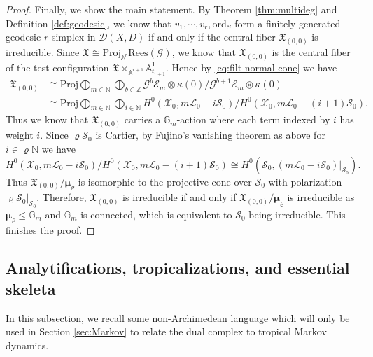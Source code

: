 \documentclass[reqno, 12pt]{amsart}
\theoremstyle{definition}
\newcommand{\bA}{\mathbb{A}}
\newcommand{\bZ}{\mathbb{Z}}
\newcommand{\bN}{\mathbb{N}}
\newcommand{\bG}{\mathbb{G}}
\newcommand{\cX}{\mathcal{X}}
\newcommand{\cL}{\mathcal{L}}
\newcommand{\cG}{\mathcal{G}}
\newcommand{\cE}{\mathcal{E}}
\newcommand{\cD}{\mathcal{D}}
\newcommand{\cS}{\mathcal{S}}
\newcommand{\ord}{\mathrm{ord}}
\newcommand{\Proj}{\mathrm{Proj}}
\newcommand{\fX}{\mathfrak{X}}
\newcommand{\bmu}{\boldsymbol{\mu}}
\newcommand{\Rees}{\mathrm{Rees}}
\numberwithin{equation}{section}
\begin{document}
\begin{proof}
Finally, we show the main statement. By Theorem \ref{thm:multideg} and Definition \ref{def:geodesic}, we know that $v_1,\cdots, v_r, \ord_S$ form a finitely generated geodesic $r$-simplex in $\cD(X,D)$ if and only if the central fiber $\fX_{(0,0)}$ is irreducible. Since $\fX \cong \Proj_{\bA^r} \Rees(\cG)$, we know that $\fX_{(0,0)}$ is the central fiber of the test configuration $\fX\times_{\bA^{r+1}} \bA^1_{t_{r+1}}$. Hence by \eqref{eq:filt-normal-cone} we have
\begin{align*}
\fX_{(0,0)} &  \cong \Proj \bigoplus_{m\in \bN} \bigoplus_{b\in \bZ} \cG^b\cE_m\otimes \kappa(0)/\cG^{b+1}\cE_m\otimes \kappa(0)\\
& \cong \Proj \bigoplus_{m\in \bN} \bigoplus_{i\in \bN} H^0(\cX_0, m\cL_0 - i \cS_0)/H^0(\cX_0, m\cL_0 - (i+1) \cS_0).
\end{align*}
Thus we know that $\fX_{(0,0)}$ carries a $\bG_m$-action where each term indexed by $i$ has weight $i$. Since $\varrho \cS_0$ is Cartier, 
by Fujino's vanishing theorem as above for $i\in \varrho\bN$ we have 
\[
H^0(\cX_0, m\cL_0 - i \cS_0)/H^0(\cX_0, m\cL_0 - (i+1) \cS_0) \cong H^0(\cS_0, (m\cL_0-i\cS_0)|_{\cS_0}).
\]
Thus $\fX_{(0,0)}/\bmu_{\varrho} $ is isomorphic to the projective cone over $\cS_0$ with polarization $\varrho \cS_0|_{\cS_0}$. Therefore, $\fX_{(0,0)}$ is irreducible if and only if    $\fX_{(0,0)}/\bmu_{\varrho} $ is irreducible as $\bmu_{\varrho}\leq \bG_m$ and $\bG_m$ is connected, which is equivalent to $\cS_0$ being irreducible. This finishes the proof.
\end{proof}



\subsection{Analytifications, tropicalizations, and essential skeleta}\label{sec:an-trop}

In this subsection, we recall some non-Archimedean language which will only be used in Section \ref{sec:Markov} to relate the dual complex to tropical Markov dynamics.
\end{document}
